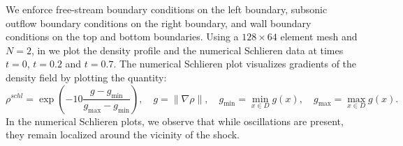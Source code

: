 \documentclass{elsarticle}
\theoremstyle{definition}
\theoremstyle{plain}
\theoremstyle{plain}
\newcommand{\reftwo}[1]{{\color{blue}#1}}
\renewcommand{\reftwo}[1]{#1}
\begin{document}
\reftwo{We enforce free-stream boundary conditions on the left boundary, subsonic outflow boundary conditions on the right boundary, and wall boundary conditions on the top and bottom boundaries.} 
Using a $128 \times 64$ element mesh and $N = 2$, in  we plot the density profile and the numerical Schlieren data at times $t = 0$, $t = 0.2$ and $t = 0.7$. The numerical Schlieren plot visualizes gradients of the density field by plotting the quantity:
\begin{equation}\label{eq:rho Schlieren}
    \rho^{schl} = \exp{\left(-10 \frac{g - g_{\min}}{g_{\max} - g_{\min}}\right)}, \quad g = \left\|\nabla \rho \right\|, \quad g_{\min} = \min_{x \in D}{g(x)}, \quad g_{\max} = \max_{x \in D}{g(x)}.
\end{equation}
In the numerical Schlieren plots, we observe that while oscillations are present, they remain localized around the vicinity of the shock. 
\end{document}

